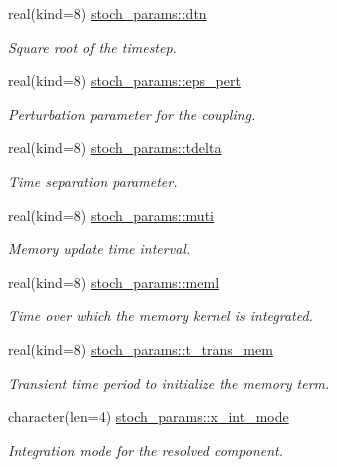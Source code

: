\begin{DoxyCompactItemize}
real(kind=8) \hyperlink{namespacestoch__params_aae1255323ba779a9cefd5a979762b778}{stoch\+\_\+params\+::dtn}
\begin{DoxyCompactList}\small\item\em Square root of the timestep. \end{DoxyCompactList}\item 
real(kind=8) \hyperlink{namespacestoch__params_aa0504e89179fe42b3f3206811f1592dc}{stoch\+\_\+params\+::eps\+\_\+pert}
\begin{DoxyCompactList}\small\item\em Perturbation parameter for the coupling. \end{DoxyCompactList}\item 
real(kind=8) \hyperlink{namespacestoch__params_a3995bce17d12b533df6b86ab0072b7c3}{stoch\+\_\+params\+::tdelta}
\begin{DoxyCompactList}\small\item\em Time separation parameter. \end{DoxyCompactList}\item 
real(kind=8) \hyperlink{namespacestoch__params_a6cfc7910476036f19018641599841686}{stoch\+\_\+params\+::muti}
\begin{DoxyCompactList}\small\item\em Memory update time interval. \end{DoxyCompactList}\item 
real(kind=8) \hyperlink{namespacestoch__params_a6de8fcb6d516d431ddc0285e0c296eb7}{stoch\+\_\+params\+::meml}
\begin{DoxyCompactList}\small\item\em Time over which the memory kernel is integrated. \end{DoxyCompactList}\item 
real(kind=8) \hyperlink{namespacestoch__params_aad7f7a2481dfb730a051ae2e0de9494c}{stoch\+\_\+params\+::t\+\_\+trans\+\_\+mem}
\begin{DoxyCompactList}\small\item\em Transient time period to initialize the memory term. \end{DoxyCompactList}\item 
character(len=4) \hyperlink{namespacestoch__params_ac3dca68023a442b69df79caaaea78894}{stoch\+\_\+params\+::x\+\_\+int\+\_\+mode}
\begin{DoxyCompactList}\small\item\em Integration mode for the resolved component. \end{DoxyCompactList}\item 

\end{DoxyCompactItemize}
